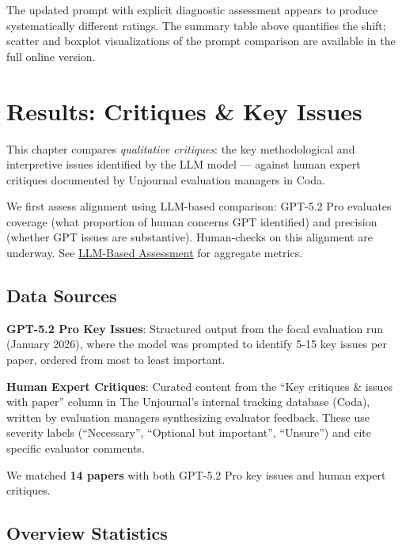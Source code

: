 \documentclass[
  11pt,
  letterpaper,
  DIV=11,
  numbers=noendperiod]{scrreprt}
\begin{document}
The updated prompt with explicit diagnostic assessment appears to
produce systematically different ratings. The summary table above
quantifies the shift; scatter and boxplot visualizations of the prompt
comparison are available in the full online version.


\chapter{Results: Critiques \& Key
Issues}\label{results-critiques-key-issues}

This chapter compares \emph{qualitative critiques}: the key
methodological and interpretive issues identified by the LLM model ---
against human expert critiques documented by Unjournal evaluation
managers in Coda.

We first assess alignment using LLM-based comparison: GPT-5.2 Pro
evaluates coverage (what proportion of human concerns GPT identified)
and precision (whether GPT issues are substantive). Human-checks on this
alignment are underway. See \hyperref[sec-llm-assessment]{LLM-Based
Assessment} for aggregate metrics.

\section{Data Sources}\label{data-sources}

\textbf{GPT-5.2 Pro Key Issues}: Structured output from the focal
evaluation run (January 2026), where the model was prompted to identify
5-15 key issues per paper, ordered from most to least important.

\textbf{Human Expert Critiques}: Curated content from the ``Key
critiques \& issues with paper'' column in The Unjournal's internal
tracking database (Coda), written by evaluation managers synthesizing
evaluator feedback. These use severity labels (``Necessary'', ``Optional
but important'', ``Unsure'') and cite specific evaluator comments.

We matched \textbf{14 papers} with both GPT-5.2 Pro key issues and human
expert critiques.

\section{Overview Statistics}\label{overview-statistics}
\end{document}
